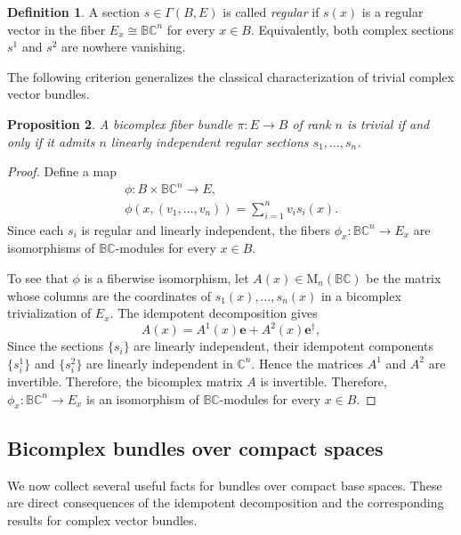\documentclass[11pt]{amsart}
\newcommand{\BC}{\mathbb{BC}}       %
\newcommand{\e}{\mathbf{e}}          %
\newcommand{\ed}{\mathbf{e}^\dagger} %
\newtheorem{prop}{Proposition}[section]   %
\theoremstyle{definition}
\newtheorem{defn}[prop]{Definition}       %
\begin{document}
\begin{defn}
    A section $s \in \Gamma(B,E)$ is called \emph{regular} if $s(x)$ is a regular vector in the fiber $E_x \cong \BC^n$ for every $x \in B$. Equivalently, both complex sections $s^1$ and $s^2$ are nowhere vanishing.
\end{defn}

The following criterion generalizes the classical characterization of trivial complex vector bundles.

\begin{prop}
    A bicomplex fiber bundle $\pi:E \to B$ of rank $n$ is trivial if and only if it admits $n$ linearly independent regular sections $s_1,\dots,s_n$.
\end{prop}

\begin{proof}
    Define a map
    \begin{gather*}
        \phi : B \times \BC^n \to E, \\ 
        \phi(x,(v_1,\dots,v_n)) = \sum_{i=1}^n v_i s_i(x).
    \end{gather*}
    Since each $s_i$ is regular and linearly independent, the fibers $\phi_x : \BC^n \to E_x$ are isomorphisms of $\BC$-modules for every $x \in B$. 
    
    To see that \(\phi\) is a fiberwise isomorphism, let \(A(x) \in \mathrm{M}_n(\BC)\) be the matrix whose columns are the coordinates of \(s_1(x),\dots,s_n(x)\) in a bicomplex trivialization of \(E_x\). The idempotent decomposition gives
\begin{equation*}
A(x) = A^1(x)\e + A^2(x)\ed,
\end{equation*}
Since the sections $\{s_i\}$ are linearly independent, their idempotent
components $\{s_i^1\}$ and $\{s_i^2\}$ are linearly independent in
$\mathbb{C}^n$. Hence the matrices $A^1$ and $A^2$ are invertible.
Therefore, the bicomplex matrix $A$ is invertible.
Therefore, \(\phi_x: \BC^n \to E_x\) is an isomorphism of \(\BC\)-modules for every \(x \in B\).
    
\end{proof}


\subsection{Bicomplex bundles over compact spaces}

We now collect several useful facts for bundles over compact base spaces. These are direct consequences of the idempotent decomposition and the corresponding results for complex vector bundles.
\end{document}

